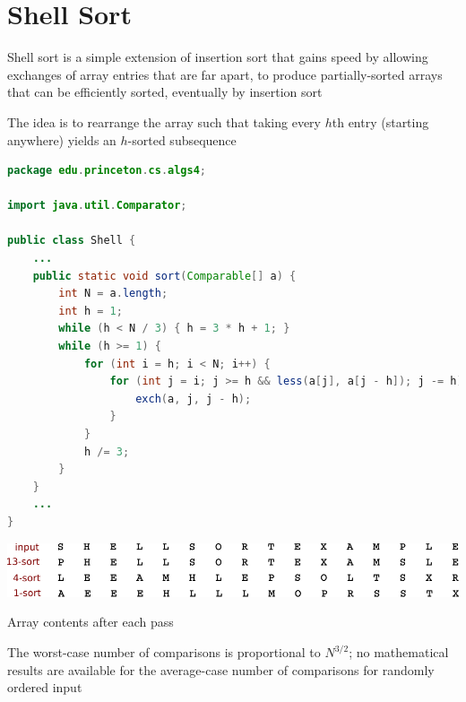 \documentclass[8pt,a4paper,compress]{beamer}
\begin{document}
\section{Shell Sort}
\begin{frame}[fragile]
Shell sort is a simple extension of insertion sort that gains speed by allowing exchanges of array entries that are far apart, to produce partially-sorted arrays that can be efficiently sorted, eventually by insertion sort

\bigskip

The idea is to rearrange the array such that taking every $h$th entry (starting anywhere) yields an $h$-sorted subsequence

\bigskip

\begin{lstlisting}[language=Java]
package edu.princeton.cs.algs4;

import java.util.Comparator;

public class Shell {
    ...
    public static void sort(Comparable[] a) {
        int N = a.length; 
        int h = 1;
        while (h < N / 3) { h = 3 * h + 1; }
        while (h >= 1) {
            for (int i = h; i < N; i++) {
                for (int j = i; j >= h && less(a[j], a[j - h]); j -= h) {
                    exch(a, j, j - h);
                }
            }
            h /= 3;
        }    
    }
    ...
}
\end{lstlisting}
\end{frame}

\begin{frame}[fragile]
\begin{center}
\includegraphics[scale=0.6]{./figures/shell_trace.pdf}

\smallskip

Array contents after each pass
\end{center}

\bigskip

The worst-case number of comparisons is proportional to $N^{3/2}$; no mathematical results are available for the average-case number of comparisons for randomly ordered input
\end{frame}
\end{document}
